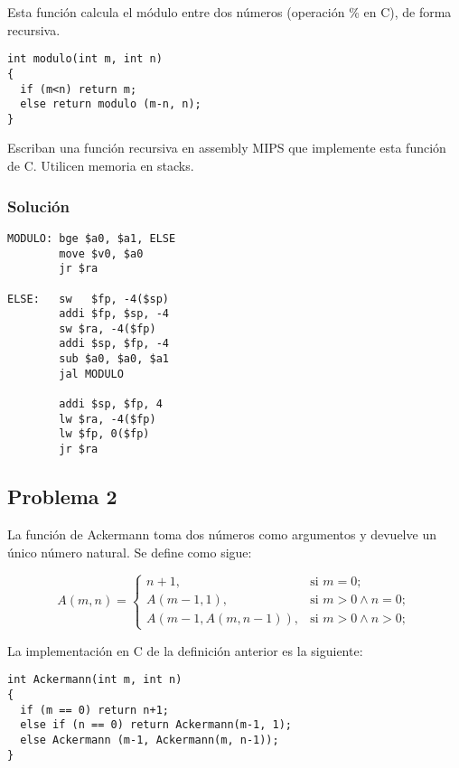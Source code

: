 \documentclass[letterpaper,11pt,notitlepage]{article}
\begin{document}
Esta función calcula el módulo entre dos números (operación \% en C), de forma recursiva.

\begin{lstlisting}[style=C]
int modulo(int m, int n)
{
  if (m<n) return m;
  else return modulo (m-n, n);
}
\end{lstlisting}


Escriban una función recursiva en assembly MIPS que implemente esta función de C. Utilicen memoria en stacks.

\subsubsection*{Solución}

\begin{lstlisting}[style=C]
MODULO: bge $a0, $a1, ELSE 
        move $v0, $a0
        jr $ra
        
ELSE:   sw   $fp, -4($sp)
        addi $fp, $sp, -4
        sw $ra, -4($fp)
        addi $sp, $fp, -4
        sub $a0, $a0, $a1
        jal MODULO
        
        addi $sp, $fp, 4
        lw $ra, -4($fp)
        lw $fp, 0($fp)
        jr $ra  
\end{lstlisting}

\newpage

\subsection*{Problema 2}

La función de Ackermann toma dos números como argumentos y devuelve un único número
natural. Se define como sigue:

\begin{equation}
A(m,n) =
\left\{
	\begin{array}{lll}
		n+1,  & \mbox{si } m=0; \\
		A(m-1, 1), & \mbox{si } m>0 \wedge n=0;\\
		A(m-1, A(m,n-1)), & \mbox{si } m>0 \land n>0;
	\end{array}
\right.
\end{equation}

La implementación en C de la definición anterior es la siguiente:

\begin{lstlisting}[style=C]
int Ackermann(int m, int n)
{
  if (m == 0) return n+1;
  else if (n == 0) return Ackermann(m-1, 1);
  else Ackermann (m-1, Ackermann(m, n-1));
}
\end{lstlisting}
\end{document}
